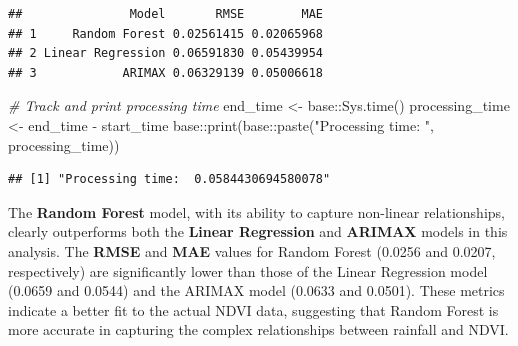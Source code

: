 \documentclass[
]{article}
\newenvironment{Shaded}{}{}
\newcommand{\AttributeTok}[1]{\textcolor[rgb]{0.49,0.56,0.16}{#1}}
\newcommand{\CommentTok}[1]{\textcolor[rgb]{0.38,0.63,0.69}{\textit{#1}}}
\newcommand{\FunctionTok}[1]{\textcolor[rgb]{0.02,0.16,0.49}{#1}}
\newcommand{\NormalTok}[1]{#1}
\newcommand{\OtherTok}[1]{\textcolor[rgb]{0.00,0.44,0.13}{#1}}
\newcommand{\SpecialCharTok}[1]{\textcolor[rgb]{0.25,0.44,0.63}{#1}}
\newcommand{\StringTok}[1]{\textcolor[rgb]{0.25,0.44,0.63}{#1}}
\begin{document}
\begin{Shaded}
\end{Shaded}

\begin{verbatim}
##               Model       RMSE        MAE
## 1     Random Forest 0.02561415 0.02065968
## 2 Linear Regression 0.06591830 0.05439954
## 3            ARIMAX 0.06329139 0.05006618
\end{verbatim}

\begin{Shaded}
\begin{Highlighting}[]
\CommentTok{\# Track and print processing time}
\NormalTok{end\_time }\OtherTok{\textless{}{-}}\NormalTok{ base}\SpecialCharTok{::}\FunctionTok{Sys.time}\NormalTok{()}
\NormalTok{processing\_time }\OtherTok{\textless{}{-}}\NormalTok{ end\_time }\SpecialCharTok{{-}}\NormalTok{ start\_time}
\NormalTok{base}\SpecialCharTok{::}\FunctionTok{print}\NormalTok{(base}\SpecialCharTok{::}\FunctionTok{paste}\NormalTok{(}\StringTok{"Processing time: "}\NormalTok{, processing\_time))}
\end{Highlighting}
\end{Shaded}

\begin{verbatim}
## [1] "Processing time:  0.0584430694580078"
\end{verbatim}

The \textbf{Random Forest} model, with its ability to capture non-linear
relationships, clearly outperforms both the \textbf{Linear Regression}
and \textbf{ARIMAX} models in this analysis. The \textbf{RMSE} and
\textbf{MAE} values for Random Forest (0.0256 and 0.0207, respectively)
are significantly lower than those of the Linear Regression model
(0.0659 and 0.0544) and the ARIMAX model (0.0633 and 0.0501). These
metrics indicate a better fit to the actual NDVI data, suggesting that
Random Forest is more accurate in capturing the complex relationships
between rainfall and NDVI.
\end{document}

